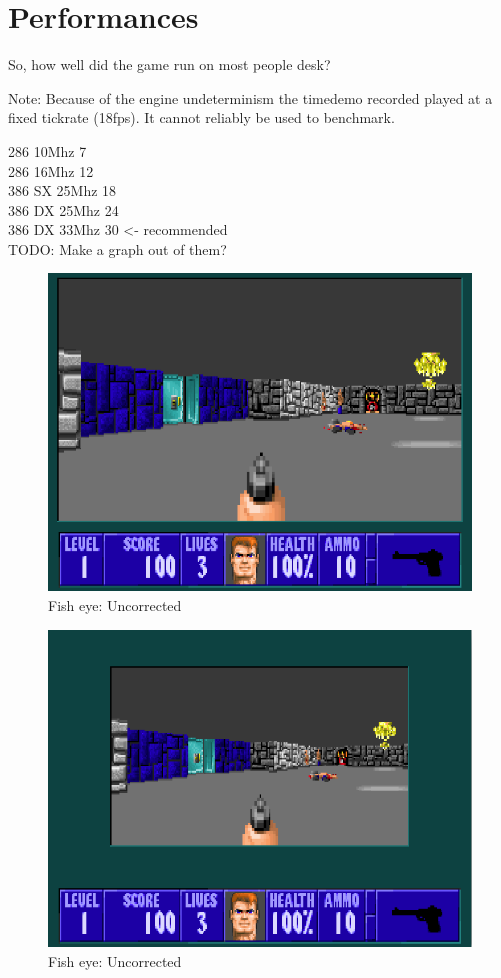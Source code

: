 \section{Performances}
So, how well did the game run on most people desk?

Note: Because of the engine undeterminism the timedemo recorded played at a fixed tickrate (18fps). It cannot reliably be used to benchmark.

286 10Mhz 7 \\
286 16Mhz 12 \\
386 SX 25Mhz  18 \\
386 DX 25Mhz 24 \\
386 DX 33Mhz 30 <- recommended \\

TODO: Make a graph out of them?

  \begin{figure}[H]
\centering
 \includegraphics[width=\textwidth]{imgs/adjust_view/100.png}
  \caption{Fish eye: Uncorrected} 
 \end{figure}
 \par

   \begin{figure}[H]
\centering
 \includegraphics[width=\textwidth]{imgs/adjust_view/50.png}
  \caption{Fish eye: Uncorrected} 
 \end{figure}
 \par

